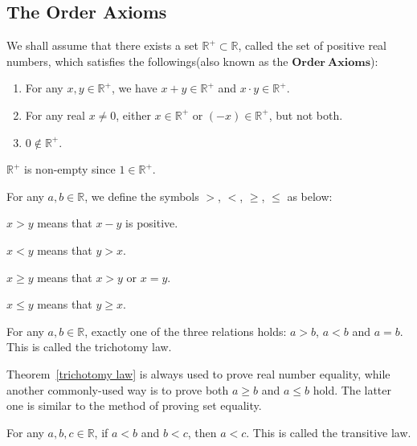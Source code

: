 \documentclass[a4paper]{ctexart}
\begin{document}
	\subsection{The Order Axioms}
	\begin{mydef}
		We shall assume that there exists a set $\mathbb{R}^+ \subset \mathbb{R}$, called the set of positive real numbers, which satisfies the followings(also known as the $\mathbf{Order\ Axioms}$):
		\begin{enumerate}
			\item For any $x,y\in \mathbb{R}^+$, we have $x+y \in \mathbb{R}^+$ and $x\cdot y \in \mathbb{R}^+$.
			\item For any real $x \neq 0$, either $x\in \mathbb{R}^+$ or $(-x)\in \mathbb{R}^+$, but not both. 
			\item $0 \notin \mathbb{R}^+$.
		\end{enumerate}
	\end{mydef}
	\begin{mypro}
		$\mathbb{R}^+$ is non-empty since $1 \in \mathbb{R}^+$.
	\end{mypro}
	\begin{mynot}
		For any $a,b\in \mathbb{R}$, we define the symbols $>$, $<$, $\geq$, $\leq$ as below:
			\item $x>y$ means that $x-y$ is positive. \centering
			\item $x<y$ means that $y>x$. \centering
			\item $x\ge y$ means that $x>y$ or $x=y$. \centering
			\item $x \le y$ means that $y \ge x$. \centering
	\end{mynot}
	\begin{mythm}\label{trichotomy law}
		For any $a,b\in \mathbb{R}$, exactly one of the three relations holds: $a>b$, $a<b$ and $a=b$. This is called the trichotomy law.
	\end{mythm}
	\begin{myrmk}
		Theorem~\ref{trichotomy law} is always used to prove real number equality, while another commonly-used way is to prove both $a\ge b$ and $a \le b$ hold. The latter one is similar to the method of proving set equality.
	\end{myrmk}
	\begin{mythm}
		For any $a,b,c\in \mathbb{R}$, if $a<b$ and $b<c$, then $a<c$. This is called the transitive law.
	\end{mythm}
\end{document}
